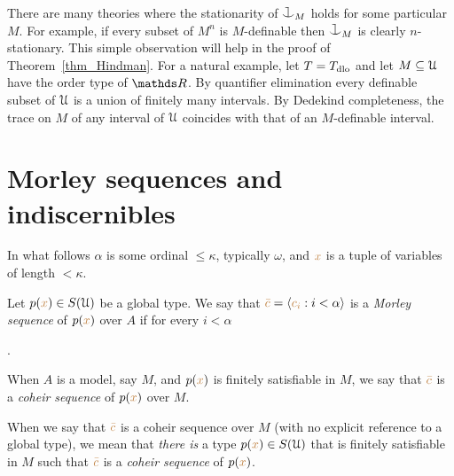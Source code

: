 \documentclass[creche.tex]{subfiles}
\begin{document}

\begin{remark}\label{rk_coheir_stationary}
There are many theories where the stationarity of $\cnonfork_M$ holds for some particular $M$.
For example, if every subset of $M^n$ is $M$-definable then $\cnonfork_M$ is clearly $n$-stationary.
This simple observation will help in the proof of Theorem~\ref{thm_Hindman}.
For a natural example, let $T=T_{\rm dlo}$ and let $M\subseteq\EuScript U$ have the order type of $\RR$.
By quantifier elimination every definable subset of $\EuScript U$ is a union of finitely many intervals.
By Dedekind completeness, the trace on $M$ of any interval of $\EuScript U$ coincides with that of an $M$-definable interval. 
\end{remark}

\section{Morley sequences and indiscernibles}


In what follows $\alpha$ is some ordinal $\le\kappa$, typically $\omega$, and ${\color{brown} x}$ is a tuple of variables of length $<\kappa$.

Let \mbox{$p({\color{brown} x})\in S(\EuScript U)$} be a global type.
We say that ${\color{brown}\bar c}=\langle{\color{brown}c_i}:i<\alpha\rangle$ is a \emph{Morley sequence\/} of $p({\color{brown} x})$ over $A$ if for every $i<\alpha$

.

When $A$ is a model, say $M$, and $p({\color{brown} x})$ is finitely satisfiable in $M$, we say that ${\color{brown}\bar c}$ is a \emph{coheir sequence\/} of $p({\color{brown} x})$ over $M$. 

When we say that ${\color{brown}\bar c}$ is a coheir sequence over $M$ (with no explicit reference to a global type), we mean that \textit{there is\/} a type $p({\color{brown} x})\in S(\EuScript U)$ that is finitely satisfiable in $M$ such that ${\color{brown}\bar c}$ is a \emph{coheir sequence\/} of $p({\color{brown} x})$.
\end{document}
